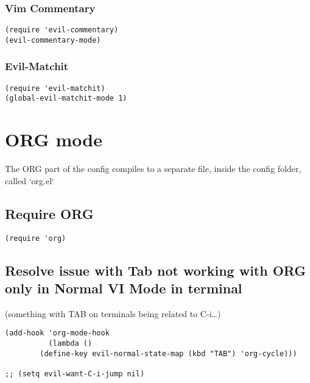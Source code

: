 \documentclass[11pt]{article}
\begin{document}
\subsubsection*{Vim Commentary}
\label{sec:org0695c9b}
\begin{verbatim}
(require 'evil-commentary)
(evil-commentary-mode)
\end{verbatim}

\subsubsection*{Evil-Matchit}
\label{sec:org63943d3}
\begin{verbatim}
(require 'evil-matchit)
(global-evil-matchit-mode 1)
\end{verbatim}




\section*{ORG mode}
\label{sec:org79b968d}

The ORG part of the config compiles to a separate file, inside the config folder, called `org.el`

\subsection*{Require ORG}
\label{sec:org7b9e053}

\begin{verbatim}
(require 'org)
\end{verbatim}

\subsection*{Resolve issue with Tab not working with ORG only in Normal VI Mode in terminal}
\label{sec:org4343aed}

(something with TAB on terminals being related to C-i\ldots{})

\begin{verbatim}
(add-hook 'org-mode-hook                                                                      
          (lambda ()                                                                          
        (define-key evil-normal-state-map (kbd "TAB") 'org-cycle))) 

;; (setq evil-want-C-i-jump nil)
\end{verbatim}
\end{document}
